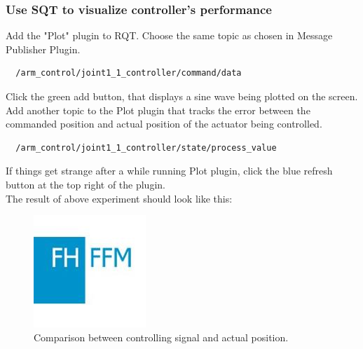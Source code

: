 \documentclass[pdftex,12pt,a4paper]{article}
\begin{document}
  \subsubsection{Use SQT to visualize controller's performance}
  Add the "Plot" plugin to RQT. Choose the same topic as chosen in Message Publisher Plugin.
  \begin{lstlisting}
  /arm_control/joint1_1_controller/command/data
  \end{lstlisting}
  Click the green add button, that displays a sine wave being plotted on the screen.\\
  Add another topic to the Plot plugin that tracks the error between the commanded position and actual position of the actuator being controlled.
  \begin{lstlisting}
  /arm_control/joint1_1_controller/state/process_value
  \end{lstlisting}
  If things get strange after a while running Plot plugin, click the blue refresh button at the top right of the plugin.\\
  The result of above experiment should look like this:
  \begin{figure}[h]
      \centering
      \includegraphics[width=0.6\linewidth]{image/FH-Frankfurt.jpg}
      \caption{Comparison between controlling signal and actual position.}
      \label{fig:gazebo_rqt}
  \end{figure}
  
  \newpage
\end{document}
